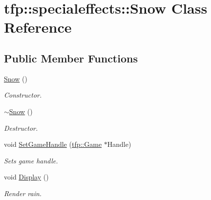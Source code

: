 \hypertarget{classtfp_1_1specialeffects_1_1_snow}{}\section{tfp\+:\+:specialeffects\+:\+:Snow Class Reference}
\label{classtfp_1_1specialeffects_1_1_snow}
\subsection*{Public Member Functions}
\begin{DoxyCompactItemize}
\item 
\mbox{\label{classtfp_1_1specialeffects_1_1_snow_a9e40f76b33762dfad85be023e8b460b1}} 
\mbox{\hyperlink{classtfp_1_1specialeffects_1_1_snow_a9e40f76b33762dfad85be023e8b460b1}{Snow}} ()
\begin{DoxyCompactList}\small\item\em Constructor. \end{DoxyCompactList}\item 
\mbox{\label{classtfp_1_1specialeffects_1_1_snow_ae69e8a5d7a7ff20dae5f4062cc695205}} 
\mbox{\hyperlink{classtfp_1_1specialeffects_1_1_snow_ae69e8a5d7a7ff20dae5f4062cc695205}{$\sim$\+Snow}} ()
\begin{DoxyCompactList}\small\item\em Destructor. \end{DoxyCompactList}\item 
void \mbox{\hyperlink{classtfp_1_1specialeffects_1_1_snow_a5063a8aeb0d896d8755ae1f9c803252d}{Set\+Game\+Handle}} (\mbox{\hyperlink{classtfp_1_1_game}{tfp\+::\+Game}} $\ast$Handle)
\begin{DoxyCompactList}\small\item\em Sets game handle. \end{DoxyCompactList}\item 
void \mbox{\hyperlink{classtfp_1_1specialeffects_1_1_snow_a02d2fd7f0d7420c0f333fe7fe234ab3d}{Display}} ()
\begin{DoxyCompactList}\small\item\em Render rain. \end{DoxyCompactList}\item 
\mbox{\label{classtfp_1_1specialeffects_1_1_snow_aef492683dc08b2f0e28d21d1281919e4}} 

\end{DoxyCompactItemize}
